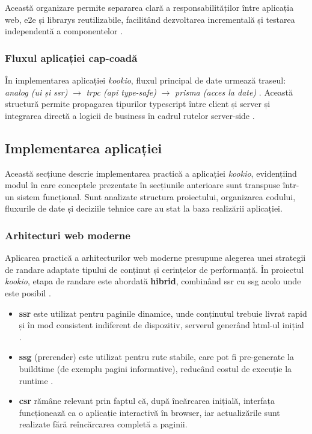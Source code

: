 Această organizare permite separarea clară a responsabilităților între aplicația \gls{web}, \gls{e2e} și \glspl{library} reutilizabile, facilitând dezvoltarea incrementală și testarea independentă a componentelor \cite{nx}.

\subsubsection{Fluxul aplicației cap-coadă}\label{subsec:e2e-flow}

În implementarea aplicației \textit{\gls{kookio}}, fluxul principal de date urmează traseul:
\textit{\Gls{analog} (\acrshort{ui} și \acrfull{ssr})} \(\rightarrow\) \textit{\acrfull{trpc} (\acrshort{api} type-safe)} \(\rightarrow\) \textit{\gls{prisma} (acces la date)} \cite{analog,trpc,prisma}.
Această structură permite propagarea tipurilor \gls{typescript} între client și server și integrarea directă a logicii de business în cadrul rutelor server-side \cite{trpc}.

\subsection{Implementarea aplicației}

Această secțiune descrie implementarea practică a aplicației \textit{\gls{kookio}}, evidențiind modul în care conceptele prezentate în secțiunile anterioare sunt transpuse într-un sistem funcțional.
Sunt analizate structura proiectului, organizarea codului, fluxurile de date și deciziile tehnice care au stat la baza realizării aplicației.

\subsubsection{Arhitecturi web moderne}

Aplicarea practică a arhitecturilor \gls{web} moderne presupune alegerea unei strategii de \gls{randare} adaptate tipului de conținut și cerințelor de performanță.
În proiectul \textit{\gls{kookio}}, etapa de \gls{randare} este abordată \textbf{hibrid}, combinând \acrfull{ssr} cu \acrfull{ssg} acolo unde este posibil \cite{analog,nitro}.

\begin{itemize}
  \item \textbf{\acrfull{ssr}} este utilizat pentru paginile dinamice, unde conținutul trebuie livrat rapid și în mod consistent indiferent de dispozitiv, serverul generând \acrshort{html}-ul inițial \cite{analog,nitro}.
  \item \textbf{\acrfull{ssg}} (prerender) este utilizat pentru rute stabile, care pot fi pre-generate la \gls{buildtime} (de exemplu pagini informative), reducând costul de execuție la runtime \cite{analog}.
  \item \textbf{\acrfull{csr}} rămâne relevant prin faptul că, după încărcarea inițială, interfața funcționează ca o aplicație interactivă în browser, iar actualizările sunt realizate fără reîncărcarea completă a paginii.
\end{itemize}

